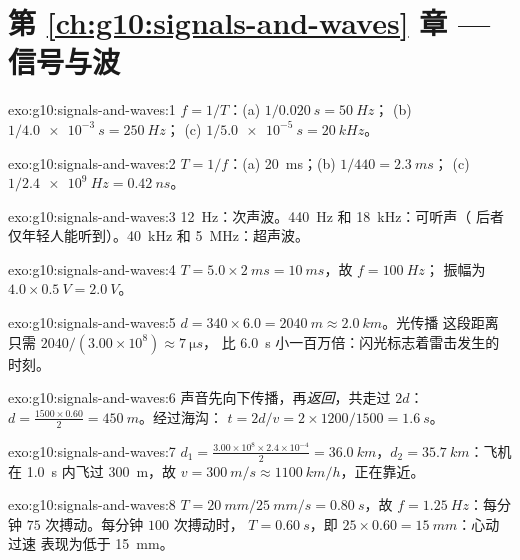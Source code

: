 \section*{第 \ref{ch:g10:signals-and-waves} 章 --- 信号与波}

\begin{solution}{exo:g10:signals-and-waves:1}
$f = 1/T$：(a) $1/\qty{0.020}{s} = \qty{50}{Hz}$；
(b) $1/\qty{4.0e-3}{s} = \qty{250}{Hz}$；
(c) $1/\qty{5.0e-5}{s} = \qty{20}{kHz}$。
\end{solution}

\begin{solution}{exo:g10:signals-and-waves:2}
$T = 1/f$：(a) \qty{20}{ms}；(b) $1/440 = \qty{2.3}{ms}$；
(c) $1/\qty{2.4e9}{Hz} = \qty{0.42}{ns}$。
\end{solution}

\begin{solution}{exo:g10:signals-and-waves:3}
\qty{12}{Hz}：次声波。\qty{440}{Hz} 和 \qty{18}{kHz}：可听声（
后者仅年轻人能听到）。\qty{40}{kHz} 和 \qty{5}{MHz}：超声波。
\end{solution}

\begin{solution}{exo:g10:signals-and-waves:4}
$T = 5.0 \times \qty{2}{ms} = \qty{10}{ms}$，故 $f = \qty{100}{Hz}$；
振幅为 $4.0 \times \qty{0.5}{V} = \qty{2.0}{V}$。
\end{solution}

\begin{solution}{exo:g10:signals-and-waves:5}
$d = 340 \times 6.0 = \qty{2040}{m} \approx \qty{2.0}{km}$。光传播
这段距离只需 $2040/(3.00\times10^{8}) \approx \qty{7}{\micro s}$，
比 \qty{6.0}{s} 小一百万倍：闪光标志着雷击发生的时刻。
\end{solution}

\begin{solution}{exo:g10:signals-and-waves:6}
声音先向下传播，再\emph{返回}，共走过 $2d$：
$d = \frac{1500 \times 0.60}{2} = \qty{450}{m}$。经过海沟：
$t = 2d/v = 2 \times 1200/1500 = \qty{1.6}{s}$。
\end{solution}

\begin{solution}{exo:g10:signals-and-waves:7}
$d_1 = \frac{3.00\times10^{8} \times 2.4\times10^{-4}}{2} =
\qty{36.0}{km}$，$d_2 = \qty{35.7}{km}$：飞机在
\qty{1.0}{s} 内飞过 \qty{300}{m}，故 $v = \qty{300}{m/s} \approx
\qty{1100}{km/h}$，正在靠近。
\end{solution}

\begin{solution}{exo:g10:signals-and-waves:8}
$T = \qty{20}{mm}/\qty{25}{mm/s} = \qty{0.80}{s}$，故
$f = \qty{1.25}{Hz}$：每分钟 $75$ 次搏动。每分钟 $100$ 次搏动时，
$T = \qty{0.60}{s}$，即 $25 \times 0.60 = \qty{15}{mm}$：心动过速
表现为低于 \qty{15}{mm}。
\end{solution}

